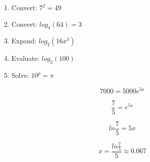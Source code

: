 \documentclass[12pt]{article}
\begin{document}
\begin{enumerate}
	\item Convert: $7^2=49$\\
	
	\item Convert: $log_{4}(64)=3$\\
	
	\item Expand: $log_{2}(16x^3)$\\
	
	\item Evaluate: $log_{3}(100)$\\
	
	\item Solve: $10^p= \pi$
\end{enumerate}


\clearpage

$$7000 = 5000e^{5x}$$

$$\frac{7}{5} = e^{5x}$$

$$ln\frac{7}{5} = 5x$$

$$x = \frac{ln\frac{7}{5}}{5} \approx 0.067$$
\end{document}
